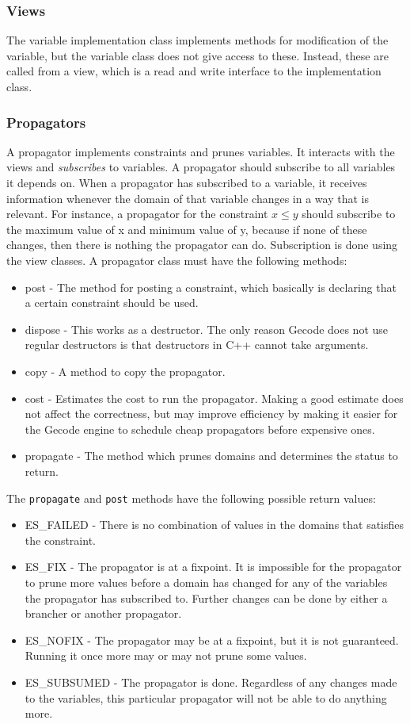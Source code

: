 \documentclass[a4paper,11pt]{article}
\begin{document}
\subsubsection{Views}
The variable implementation class implements methods for modification of the variable, but the variable class does not give access to these. Instead, these are called from a view, which is a read and write interface to the implementation class.

\subsubsection{Propagators}
\label{sec:propagators}
A propagator implements constraints and prunes variables. It interacts with the views and \textit{subscribes} to variables. A propagator should subscribe to all variables it depends on. When a propagator has subscribed to a variable, it receives information whenever the domain of that variable changes in a way that is relevant. For instance, a propagator for the constraint $x\le y$ should subscribe to the maximum value of x and minimum value of y, because if none of these changes, then there is nothing the propagator can do. Subscription is done using the view classes. A propagator class must have the following methods:
\begin{itemize}
\item{post} - The method for posting a constraint, which basically is declaring that a certain constraint should be used.
\item{dispose} - This works as a destructor. The only reason Gecode does not use regular destructors is that destructors in C++ cannot take arguments.
\item{copy} - A method to copy the propagator.
\item{cost} - Estimates the cost to run the propagator. Making a good estimate does not affect the correctness, but may improve efficiency by making it easier for the Gecode engine to schedule cheap propagators before expensive ones.
\item{propagate} - The method which prunes domains and determines the status to return.
\end{itemize}
The \texttt{propagate} and \texttt{post} methods have the following possible return values:
\begin{itemize}
\item{ES\_FAILED} - There is no combination of values in the domains that satisfies the constraint. 
\item{ES\_FIX} - The propagator is at a fixpoint. It is impossible for the propagator to prune more values before a domain has changed for any of the variables the propagator has subscribed to. Further changes can be done by either a brancher or another propagator.
\item{ES\_NOFIX} - The propagator may be at a fixpoint, but it is not guaranteed. Running it once more may or may not prune some values. 
\item{ES\_SUBSUMED} - The propagator is done. Regardless of any changes made to the variables, this particular propagator will not be able to do anything more.
\end{itemize}
\end{document}
